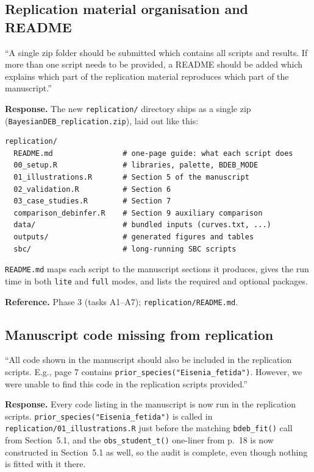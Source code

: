 \documentclass[11pt,a4paper]{article}
\newcommand{\code}[1]{\texttt{#1}}
\begin{document}
\subsection{Replication material organisation and README}

\begin{displayquote}
``A single zip folder should be submitted which contains all
scripts and results. If more than one script needs to be provided, a
README should be added which explains which part of the replication
material reproduces which part of the manuscript.''
\end{displayquote}

\textbf{Response.} The new \code{replication/} directory ships as a
single zip (\code{BayesianDEB\_replication.zip}), laid out like this:

\begin{Verbatim}[fontsize=\small]
replication/
  README.md                # one-page guide: what each script does
  00_setup.R               # libraries, palette, BDEB_MODE
  01_illustrations.R       # Section 5 of the manuscript
  02_validation.R          # Section 6
  03_case_studies.R        # Section 7
  comparison_debinfer.R    # Section 9 auxiliary comparison
  data/                    # bundled inputs (curves.txt, ...)
  outputs/                 # generated figures and tables
  sbc/                     # long-running SBC scripts
\end{Verbatim}

\code{README.md} maps each script to the manuscript sections it produces,
gives the run time in both \code{lite} and \code{full} modes, and lists
the required and optional packages.

\textbf{Reference.} Phase 3 (tasks A1--A7); \code{replication/README.md}.

\subsection{Manuscript code missing from replication}

\begin{displayquote}
``All code shown in the manuscript should also be included in
the replication scripts. E.g., page 7 contains
\verb|prior_species("Eisenia_fetida")|. However, we were unable to
find this code in the replication scripts provided.''
\end{displayquote}

\textbf{Response.} Every code listing in the manuscript is now run in the
replication scripts. \verb|prior_species("Eisenia_fetida")| is called in
\code{replication/01\_illustrations.R} just before the matching
\code{bdeb\_fit()} call from Section~5.1, and the \code{obs\_student\_t()}
one-liner from p.~18 is now constructed in Section~5.1 as well, so the
audit is complete, even though nothing is fitted with it there.
\end{document}
